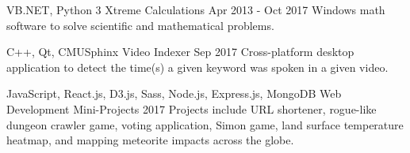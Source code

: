 \begin{cventries}
  \cventry
    {VB.NET, Python 3} %
    {Xtreme Calculations} %
    {} %
    {Apr 2013 - Oct 2017} %
    {
      Windows math software to solve scientific and mathematical problems.
    }

  \cventry
    {C++, Qt, CMUSphinx} %
    {Video Indexer} %
    {} %
    {Sep 2017} %
    {
      Cross-platform desktop application to detect the time(s) a given keyword was spoken in a given video.
    }

  \cventry
    {JavaScript, React.js, D3.js, Sass, Node.js, Express.js, MongoDB} %
    {Web Development Mini-Projects} %
    {} %
    {2017} %
    {
      Projects include URL shortener, rogue-like dungeon crawler game, voting application, Simon game, land surface temperature heatmap, and mapping meteorite impacts across the globe.
    }


\end{cventries}

